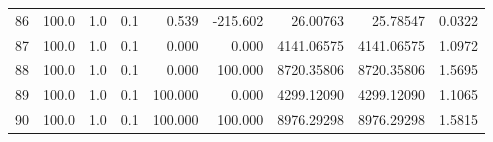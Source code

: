 \begin{longtable}{rrrrrrrrr}
    86 & 100.0 & 1.0 & 0.1 & 0.539 & -215.602 & 26.00763 & 25.78547 & 0.0322 \\
    87 & 100.0 & 1.0 & 0.1 & 0.000 & 0.000 & 4141.06575 & 4141.06575 & 1.0972 \\
    88 & 100.0 & 1.0 & 0.1 & 0.000 & 100.000 & 8720.35806 & 8720.35806 & 1.5695 \\
    89 & 100.0 & 1.0 & 0.1 & 100.000 & 0.000 & 4299.12090 & 4299.12090 & 1.1065 \\
    90 & 100.0 & 1.0 & 0.1 & 100.000 & 100.000 & 8976.29298 & 8976.29298 & 1.5815 \\
    \bottomrule
\end{longtable}
